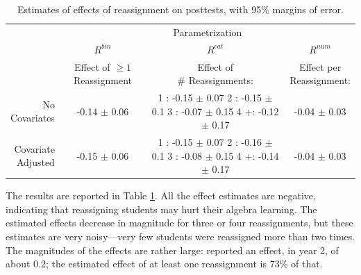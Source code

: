 \documentclass[notitlepage,12pt]{jedm}\usepackage[]{graphicx}\usepackage[]{color}
\begin{document}
\begin{table}
  \centering
\begin{tabular}{r|c|c|c|}
&\multicolumn{3}{c}{Parametrization}\\
&$R^{bin}$&$R^{cat}$&$R^{num}$\\
&\makecell[c]{Effect of\\ $\ge 1$ Reassignment}&\makecell[l]{Effect of\\  \# Reassignments:}& \makecell[c]{Effect per\\ Reassignment:}\\
\hline
\makecell[r]{No\\Covariates}&-0.14 $\pm$ 0.06 &\makecell[l]{1 :   -0.15 $\pm$ 0.07 \\2 :   -0.15 $\pm$ 0.1 \\3 :   -0.07 $\pm$ 0.15 \\4 +:  -0.12 $\pm$ 0.17 }&-0.04 $\pm$ 0.03 \\
\hline\makecell[r]{Covariate\\ Adjusted}&-0.15 $\pm$ 0.06 &\makecell[l]{1 :  -0.15 $\pm$ 0.07 \\2 :  -0.16 $\pm$ 0.1 \\3 :  -0.08 $\pm$ 0.15 \\4 +:  -0.14 $\pm$ 0.17 }&-0.04 $\pm$ 0.03 \\
\hline
\end{tabular}
\caption{Estimates of effects of reassignment on posttests, with 95\% margins of error.}
\label{effectResults}
\end{table}

The results are reported in Table \ref{effectResults}.
All the effect estimates are negative, indicating that reassigning students may hurt their algebra learning.
The estimated effects decrease in magnitude for three or four reassignments, but these estimates are very noisy---very few students were reassigned more than two times.
The magnitudes of the effects are rather large:  reported an effect, in year 2, of about 0.2; the estimated effect of at least one reassignment is 73\% of that.
\end{document}
